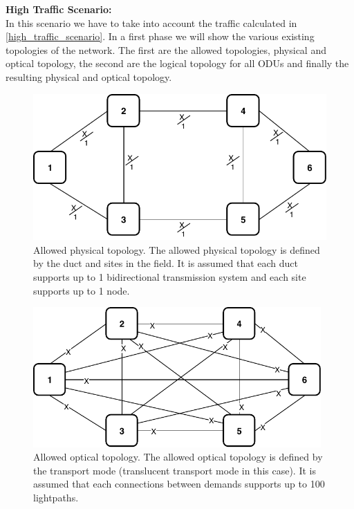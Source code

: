 \newpage
\textbf{High Traffic Scenario:}\\

In this scenario we have to take into account the traffic calculated in \ref{high_traffic_scenario}. In a first phase we will show the various existing topologies of the network. The first are the allowed topologies, physical and optical topology, the second are the logical topology for all ODUs and finally the resulting physical and optical topology.

\begin{figure}[h!]
\centering
\includegraphics[width=12cm]{sdf/ilp/translucent_survivability/figures/allowed_physical_topology}
\caption{Allowed physical topology. The allowed physical topology is defined by the duct and sites in the field. It is assumed that each duct supports up to 1 bidirectional transmission system and each site supports up to 1 node.}
\label{allowed3_physical_high}
\end{figure}
\newpage
\begin{figure}[h!]
\centering
\includegraphics[width=11cm]{sdf/ilp/translucent_survivability/figures/allowed_optical_topology}
\caption{Allowed optical topology. The allowed optical topology is defined by the transport mode (translucent transport mode in this case). It is assumed that each connections between demands supports up to 100 lightpaths.}
\label{allowed3_optical_high}
\end{figure}

